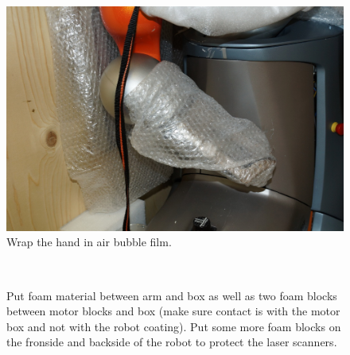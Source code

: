 \begin{figure}[h!]
\centering
\includegraphics[width=1\textwidth]{images/packing_09.jpg}
\caption{Wrap the hand in air bubble film.}
\end{figure}

\begin{figure}[h!]
\centering
\mbox{\quad
{}}
\caption{Put foam material between arm and box as well as two foam blocks between motor blocks and box (make sure contact is with the motor box and not with the robot coating). Put some more foam blocks on the fronside and backside of the robot to protect the laser scanners.} %
\end{figure}

